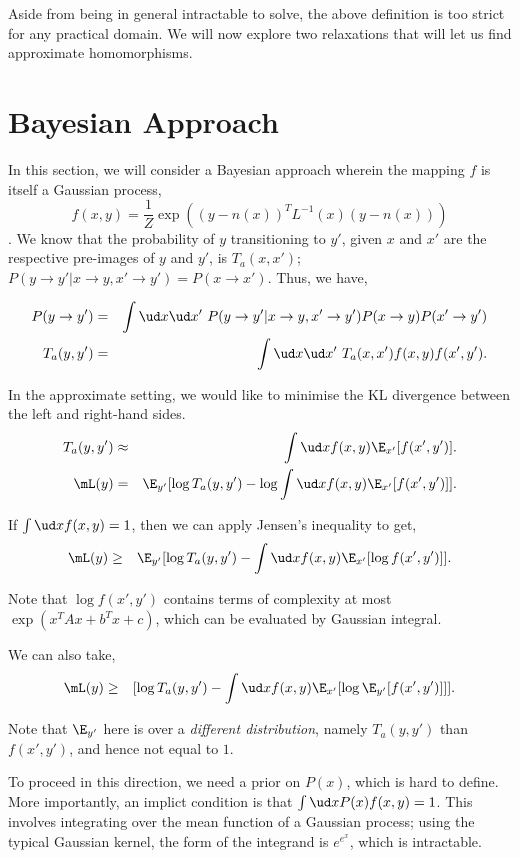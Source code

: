 Aside from being in general intractable to solve, the above definition
is too strict for any practical domain. We will now explore two
relaxations that will let us find approximate homomorphisms.

\section{Bayesian Approach}
\label{sec:alt-hom-approaches:bayesian}
In this section, we will consider a Bayesian approach wherein the
mapping $f$ is itself a Gaussian process, $$f(x,y) = \frac{1}{Z}\exp(
(y-n(x))^T L^{-1}(x) (y-n(x)) )$$. We know that the probability of $y$
transitioning to $y'$, given $x$ and $x'$ are the respective pre-images
of $y$ and $y'$, is $T_a(x,x')$; $P(y \to y' | x \to y, x' \to y') = P(x
\to x')$. Thus, we have,

\begin{eqnarray*}
P(y \to y') &=& \int \ud x \ud x' ~ P(y \to y'|x \to y, x' \to y') P(x \to y) P(x' \to y') \\
T_a(y,y') &=& \int \ud x \ud x' ~ T_a(x,x') f(x,y) f(x',y').
\end{eqnarray*}

In the approximate setting, we would like to minimise the KL divergence
between the left and right-hand sides.
\begin{eqnarray*}
  T_a(y,y') &\approx& \int \ud x f(x,y) \E_{x'}[ f(x',y') ].\\
  \mL(y) &=& \E_{y'} [ \log T_a(y,y') - \log \int \ud x f(x,y) \E_{x'}[ f(x',y') ] ].
\end{eqnarray*}

If $\int \ud x f(x,y) = 1$, then we can apply Jensen's inequality to get,
\begin{eqnarray*}
  \mL(y) &\ge& \E_{y'} [ \log T_a(y,y') - \int \ud x f(x,y) \E_{x'}[ \log f(x',y') ] ].
\end{eqnarray*}

Note that $\log f(x',y')$ contains terms of complexity at most $\exp(x^T
A x + b^T x + c)$, which can be evaluated by Gaussian integral.

\begin{note}
  We can also take,
  \begin{eqnarray*}
    \mL(y) &\ge& [ \log T_a(y,y') - \int \ud x f(x,y) \E_{x'}[ \log \E_{y'}[ f(x',y') ] ] ].
  \end{eqnarray*}

  Note that $\E_{y'}$ here is over a {\em different distribution},
  namely $T_a(y,y')$ than $f(x',y')$, and hence not equal to $1$.
\end{note}

To proceed in this direction, we need a prior on $P(x)$, which is hard to
define. More importantly, an implict condition is that $\int \ud x P(x)
f(x,y) = 1$. This involves integrating over the mean function of
a Gaussian process; using the typical Gaussian kernel, the form of the
integrand is $e^{e^{x}}$, which is intractable. 

